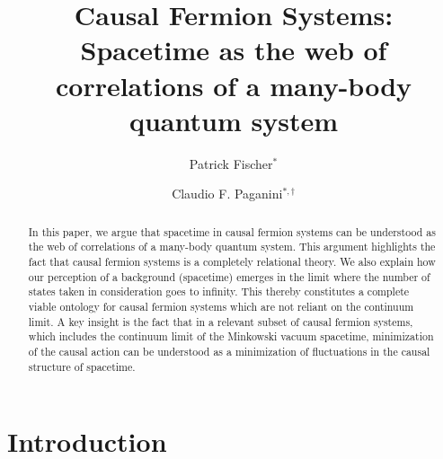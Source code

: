 \documentclass[reqno,11pt]{amsart}
\numberwithin{equation}{section}
\begin{document}
    \begin{abstract}
    In this paper, we argue that spacetime in causal fermion systems can be understood as the web of correlations of a many-body quantum system.
    This argument highlights the fact that causal fermion systems is a completely relational theory.
    We also explain how our perception of a background (spacetime) emerges in the limit where the number of states taken in consideration goes to infinity. This thereby constitutes a complete viable ontology for causal fermion systems which are not reliant on the continuum limit. A key insight is the fact that in a relevant subset of causal fermion systems, which includes the continuum limit of the Minkowski vacuum spacetime,  minimization of the causal action can be understood as a minimization of fluctuations in the causal structure of spacetime. 
\end{abstract}

    \title[Causal Fermion Systems]{Causal Fermion Systems: Spacetime as the web of correlations of a many-body quantum system}

    \author[P. Fischer]{Patrick Fischer$^*$}
    \address{$^*$ Fakultät für Mathematik \\ Universität Regensburg \\ D-93040 Regensburg \\ Germany}

    \author[C. F. Paganini]{Claudio F. Paganini$^{*, \dagger}$}
   
    \address{$^\dagger$ Fakultät für Mathematik \\ TU Chemnitz\\ D-09111 Chemnitz \\ Germany}

    \maketitle

    \tableofcontents

    \section{Introduction}\label{sec:introduction}
\end{document}
